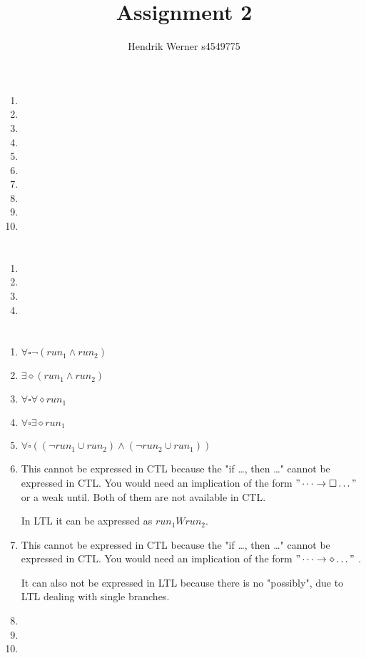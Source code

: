 \documentclass[12pt, a4paper]{article}
\title{Assignment 2}
\author{Hendrik Werner s4549775}
\begin{document}
\maketitle

\section{} %
\begin{enumerate}[a]
	\item %
	\item %
	\item %
	\item %
	\item %
	\item %
	\item %
	\item %
	\item %
	\item %
\end{enumerate}

\section{} %
\begin{enumerate}[a]
	\item %
	\item %
	\item %
	\item %
\end{enumerate}

\section{} %
\begin{enumerate}[a]
	\item %
	$\forall \square \lnot (run_1 \land run_2)$
	\item %
	$\exists \diamond (run_1 \land run_2)$
	\item %
	$\forall \square \forall \diamond run_1$
	\item %
	$\forall \square \exists \diamond run_1$
	\item %
	$\forall \square ((\lnot run_1 \cup run_2) \land (\lnot run_2 \cup run_1))$
	\item %
	This cannot be expressed in CTL because the "if \dots, then \dots" cannot be expressed in CTL. You would need an implication of the form $"\dots \rightarrow \square \dots"$ or a weak until. Both of them are not available in CTL.

	In LTL it can be axpressed as $run_1 W run_2$.
	\item %
	This cannot be expressed in CTL because the "if \dots, then \dots" cannot be expressed in CTL. You would need an implication of the form $"\dots \rightarrow \diamond \dots"$ .

	It can also not be expressed in LTL because there is no "possibly", due to LTL dealing with single branches.
	\item %
	\item %
	\item %
\end{enumerate}
\end{document}

